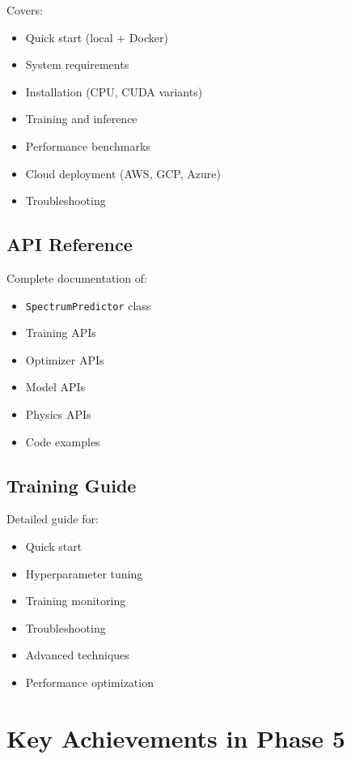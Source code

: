 \documentclass[12pt,a4paper,oneside]{report}
\begin{document}
Covers:
\begin{itemize}
    \item Quick start (local + Docker)
    \item System requirements
    \item Installation (CPU, CUDA variants)
    \item Training and inference
    \item Performance benchmarks
    \item Cloud deployment (AWS, GCP, Azure)
    \item Troubleshooting
\end{itemize}

\subsection{API Reference}

Complete documentation of:
\begin{itemize}
    \item \texttt{SpectrumPredictor} class
    \item Training APIs
    \item Optimizer APIs
    \item Model APIs
    \item Physics APIs
    \item Code examples
\end{itemize}

\subsection{Training Guide}

Detailed guide for:
\begin{itemize}
    \item Quick start
    \item Hyperparameter tuning
    \item Training monitoring
    \item Troubleshooting
    \item Advanced techniques
    \item Performance optimization
\end{itemize}

\section{Key Achievements in Phase 5}
\end{document}
